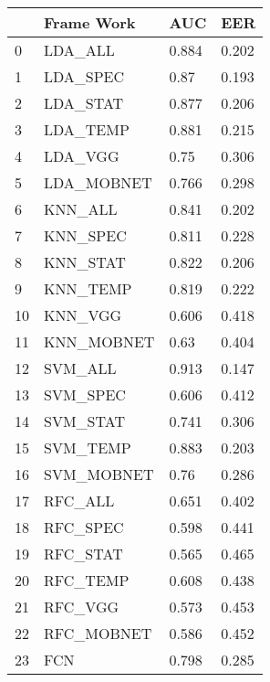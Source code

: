 \begin{tabular}{llll}
\toprule
{} &  Frame Work &    AUC &    EER \\
\midrule
0  &     LDA\_ALL &  0.884 &  0.202 \\
1  &    LDA\_SPEC &   0.87 &  0.193 \\
2  &    LDA\_STAT &  0.877 &  0.206 \\
3  &    LDA\_TEMP &  0.881 &  0.215 \\
4  &     LDA\_VGG &   0.75 &  0.306 \\
5  &  LDA\_MOBNET &  0.766 &  0.298 \\
6  &     KNN\_ALL &  0.841 &  0.202 \\
7  &    KNN\_SPEC &  0.811 &  0.228 \\
8  &    KNN\_STAT &  0.822 &  0.206 \\
9  &    KNN\_TEMP &  0.819 &  0.222 \\
10 &     KNN\_VGG &  0.606 &  0.418 \\
11 &  KNN\_MOBNET &   0.63 &  0.404 \\
12 &     SVM\_ALL &  0.913 &  0.147 \\
13 &    SVM\_SPEC &  0.606 &  0.412 \\
14 &    SVM\_STAT &  0.741 &  0.306 \\
15 &    SVM\_TEMP &  0.883 &  0.203 \\
16 &  SVM\_MOBNET &   0.76 &  0.286 \\
17 &     RFC\_ALL &  0.651 &  0.402 \\
18 &    RFC\_SPEC &  0.598 &  0.441 \\
19 &    RFC\_STAT &  0.565 &  0.465 \\
20 &    RFC\_TEMP &  0.608 &  0.438 \\
21 &     RFC\_VGG &  0.573 &  0.453 \\
22 &  RFC\_MOBNET &  0.586 &  0.452 \\
23 &         FCN &  0.798 &  0.285 \\
\bottomrule
\end{tabular}
